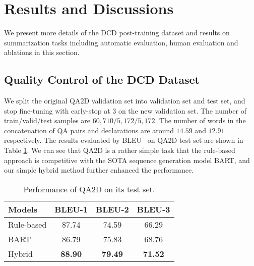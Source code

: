 \section{Results and Discussions}
\label{sec:results}
We present more details of the DCD post-training dataset and results on summarization tasks including automatic evaluation, human evaluation and ablations in this section.
\subsection{Quality Control of the DCD Dataset}\label{sec:dpdresults}


We split the original QA2D validation set into validation set and test set, and stop fine-tuning with early-stop at $3$ on the new validation set. The number of train/valid/test samples are $60,710/5,172/5,172$. The number of words in the concatenation of QA pairs and declarations are around $14.59$ and $12.91$ respectively.
The results evaluated by BLEU~\cite{papineni2002bleu} on QA2D test set are shown in Table \ref{tab:qa2dresults}. We can see that QA2D is a rather simple task that the rule-based approach is competitive with the SOTA sequence generation model BART, and our simple hybrid method further enhanced the performance.

\begin{table}
	\small
	\centering
	\begin{tabular}{lccc}
		\toprule[1pt]
		\textbf{Models} & \textbf{BLEU-1}& \textbf{BLEU-2}& \textbf{BLEU-3} \\ 
		\midrule[1pt]
		{Rule-based} & 87.74 &74.59&66.29\\
		{BART}& 86.79 & 75.83&68.76\\
		{Hybrid} &\textbf{88.90}&\textbf{79.49}&\textbf{71.52}\\
		\bottomrule[1pt]
	\end{tabular}
	\caption{Performance of QA2D on its test set.}
	\label{tab:qa2dresults}
\end{table}



